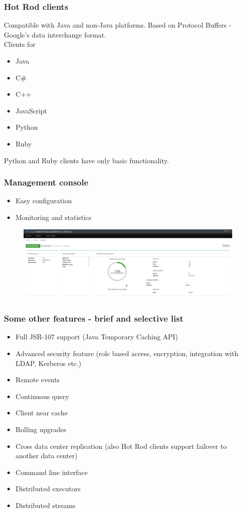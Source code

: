 \documentclass[10pt,utf8]{beamer}
\begin{document}
\begin{frame}
  \frametitle{Hot Rod clients}
	Compatible with Java and non-Java platforms. Based on Protocol Buffers - Google's data interchange format.\\
	\vspace{0.5cm}
	Clients for
	\begin{itemize}
		\item Java
		\item C\#
		\item C++
		\item JavaScript
		\item Python
		\item Ruby
	\end{itemize}
	Python and Ruby clients have only basic functionality.
\end{frame}

\begin{frame}
	\frametitle{Management console}
	\begin{itemize}
	 \item Easy configuration
	 \item Monitoring and statistics 
	\end{itemize}
	\begin{figure}
		\centering
		\includegraphics[width=12cm]{./img/mgmt-console.eps}
	\end{figure}
\end{frame}


\begin{frame}
  \frametitle{Some other features - brief and selective list}
  \begin{itemize}
		\item Full JSR-107 support (Java Temporary Caching API)
		\pause
		\item Advanced security feature (role based access, encryption, integration with LDAP, Kerberos etc.)
		\pause
		\item Remote events
		\pause
		\item Continuous query
		\pause
		\item Client near cache
		\pause
		\item Rolling upgrades
		\pause
		\item Cross data center replication (also Hot Rod clients support failover to another data center)
		\pause
		\item Command line interface
		\pause
		\item Distributed executors
		\pause
		\item Distributed streams
  \end{itemize}
\end{frame}
\end{document}
